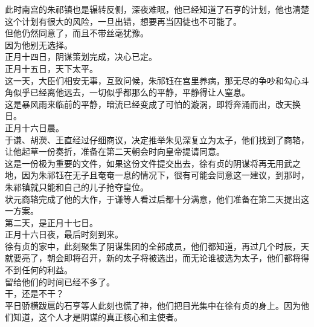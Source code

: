 \begin{multicols}{\theparacolNo}
此时南宫的朱祁镇也是辗转反侧，深夜难眠，他已经知道了石亨的计划，他也清楚这个计划有很大的风险，一旦出错，想要再当囚徒也不可能了。\\

但他仍然同意了，而且不带丝毫犹豫。\\

因为他别无选择。\\

正月十四日，阴谋策划完成，决心已定。\\

正月十五日，天下太平。\\

这一天，大臣们相安无事，互致问候，朱祁钰在宫里养病，那无尽的争吵和勾心斗角似乎已经离他远去，一切似乎都那么的平静，平静得让人窒息。\\

这是暴风雨来临前的平静，暗流已经变成了可怕的漩涡，即将奔涌而出，改天换日。\\

正月十六日晨。\\

于谦、胡濙、王直经过仔细商议，决定推举朱见深复立为太子，他们找到了商辂，让他起草一份奏折，准备在第二天朝会时向皇帝提请同意。\\

这是一份极为重要的文件，如果这份文件提交出去，徐有贞的阴谋将再无用武之地，因为朱祁钰在无子且奄奄一息的情况下，很有可能会同意这一建议，到那时，朱祁镇就只能和自己的儿子抢夺皇位。\\

状元商辂完成了他的大作，于谦等人看过后都十分满意，他们准备在第二天提出这一方案。\\

第二天，是正月十七日。\\

正月十六日夜，最后时刻到来。\\

徐有贞的家中，此刻聚集了阴谋集团的全部成员，他们都知道，再过几个时辰，天就要亮了，朝会即将召开，新的太子将被选出，而无论谁被选为太子，他们都将得不到任何的利益。\\

留给他们的时间已经不多了。\\

干，还是不干？\\

平日骄横跋扈的石亨等人此刻也慌了神，他们把目光集中在徐有贞的身上。因为他们知道，这个人才是阴谋的真正核心和主使者。\\


\end{multicols}

